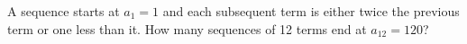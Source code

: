 A sequence starts at $a_1=1$ and each subsequent term is either twice the previous term or one less than it. How many sequences of 12 terms end at $a_{12}=120$?
